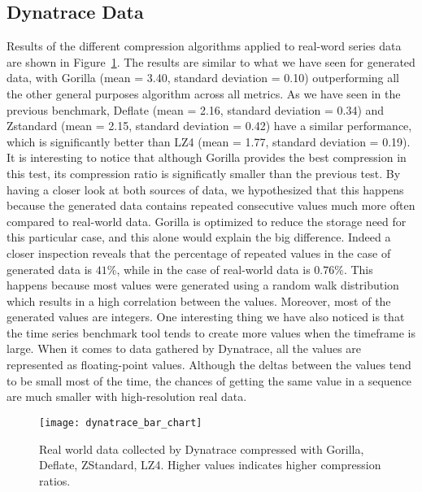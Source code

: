\subsection{Dynatrace Data}
Results of the different compression algorithms applied to real-word series data are shown in
Figure~\ref{dynatrace_compression}. The results are similar to what we have seen for generated data,
with Gorilla (mean = 3.40, standard deviation = 0.10) outperforming all the other general purposes algorithm across all metrics.
As we have seen in the previous benchmark, Deflate (mean = 2.16, standard deviation = 0.34) and Zstandard (mean = 2.15, standard deviation = 0.42)
have a similar performance, which is significantly better than LZ4 (mean = 1.77, standard deviation = 0.19).
It is interesting to notice that although Gorilla provides the best compression in this test, its compression ratio is significatly smaller than the 
previous test.
By having a closer look at both sources of data, we hypothesized that this happens because the generated data contains repeated consecutive values
much more often compared to real-world data. Gorilla is optimized to reduce the storage need for this particular case, and this
alone would explain the big difference.
Indeed a closer inspection reveals that the percentage of repeated values in the case of generated data is $41\%$, while in the case
of real-world data is $0.76\%$.
This happens because most values were generated using a random walk distribution which results in a high correlation between the values. Moreover, most of the generated
values are integers. One interesting thing we have also noticed is that the time series benchmark tool tends to create more values when the timeframe is large.
When it comes to data gathered by Dynatrace, all the values are represented as floating-point values. Although the deltas between the values tend to be small most of
the time, the chances of getting the same value in a sequence are much smaller with high-resolution real data.  

\begin{figure}[!htbp]
\begin{center}
\texttt{[image: dynatrace\_bar\_chart]}
\caption[compression]{Real world data collected by Dynatrace compressed with Gorilla, Deflate, ZStandard, LZ4.
Higher values indicates higher compression ratios.}
\label{dynatrace_compression}
\end{center}
\end{figure}

